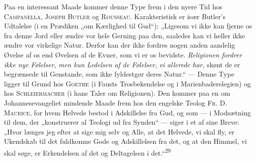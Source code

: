\documentclass[12pt,a4paper,openany]{book}
\begin{document}
Paa en interessant Maade kommer denne Type frem i den nyere Tid hos
\textsc{Campanella, Joseph Butler} og \textsc{Rousseau}. Karakteristisk
er især Butler’s Udtalelse (i en Prædiken „om Kærlighed til Gud“):
„Ligesom vi ikke kan fjerne os fra denne Jord eller ændre vor hele
Gerning paa den, saaledes kan vi heller ikke ændre vor virkelige Natur.
Derfor kan der ikke fordres nogen anden aandelig Øvelse af os end
Øvelsen af de Evner, som vi er os bevidste. \textit{Religionen fordrer
ikke nye Følelser, men kun Ledelsen af de Følelser, vi allerede har,}
skønt de er begrænsede til Genstande, som ikke fyldestgør deres Natur.“
--- Denne Type ligger til Grund hos \textsc{Goethe} (i Fausts
Trosbekendelse og i Marienbaderelegien) og hos \textsc{Schleiermacher}
(i hans Taler om Religionen). Den kommer paa en om Johannesevangeliet
mindende Maade frem hos den engelske Teolog \textsc{Fr}. \textsc{D.
Maurice}, for hvem Helvede bestod i Adskillelse fra Gud, og som --- i
Modsætning til dem, der „konstruerer al Teologi ud fra Synden“ --- siger
i et af sine Breve: „Hvor længes jeg efter at sige mig selv og Alle, at
det Helvede, vi skal fly, er Ukendskab til det fuldkomne Gode og
Adskillelsen fra det, og at den Himmel, vi skal søge, er Erkendelsen af
det og Deltagelsen i det.“\textsuperscript{29}
\end{document}
